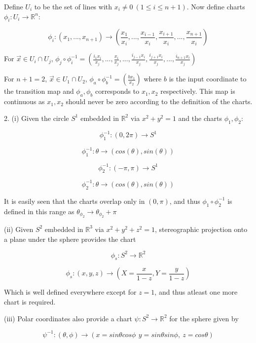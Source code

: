 \documentclass{article}\usepackage[]{graphicx}\usepackage[]{color}
\begin{document}
Define $U_i$ to be the set of lines with $x_i\neq 0 \ (1\leq i\leq n+1)$. Now define charts $\phi_i:U_i\rightarrow \mathbb{R}^n$:

$$
\phi_i: (x_1,...,x_{n+1})\rightarrow \left(\frac{x_1}{x_i},...,\frac{x_{i-1}}{x_i},\frac{x_{i+1}}{x_i},...,\frac{x_{n+1}}{x_i}\right)
$$ 

For $\vec{x}\in U_i\cap U_j$, $\phi_j\circ\phi_i^{-1}=
\left(\frac{i_1 x_i}{x_j},...,\frac{x_i}{x_j} ,...,\frac{i_{j-1}x_i}{x_j},\frac{i_{j+1}x_i}{x_j},...,\frac{i_{n+1}x_i}{x_j}\right)
$

For $n+1=2$, $\vec{x}\in U_1\cap U_2$, $\phi_a\circ\phi_b^{-1}=
\left(\frac{bx_1}{x_2}\right) 
$ where $b$ is the input coordinate to the transition map and $\phi_a,\phi_b$ corresponds to $x_1,x_2$ respectively. This map is continuous as $x_1,x_2$ should never be zero according to the definition of the charts.

2. (i) Given the circle $S^1$ embedded in $\mathbb{R}^2$ via $x^2+y^2=1$ and the charts $\phi_1 ,\phi_2$:

$$
\phi_1^{-1}: (0,2\pi )\rightarrow S^1
$$

\vspace{-.3cm}

$$
\phi_1^{-1}: \theta \rightarrow (cos(\theta ),sin(\theta ))
$$

\medskip

$$
\phi_2^{-1}: (-\pi ,\pi )\rightarrow S^1
$$

\vspace{-.3cm}

$$
\phi_2^{-1}: \theta \rightarrow (cos(\theta ),sin(\theta ))
$$

It is easily seen that the charts overlap only in $(0,\pi )$, and thus $\phi_1\circ\phi_2^{-1}$ is defined in this range as $\theta_{\phi_2}\rightarrow\theta_{\phi_2}+\pi$

(ii) Given $S^2$ embedded in $\mathbb{R}^3$ via $x^2+y^2+z^2=1$, stereographic projection onto a plane under the sphere provides the chart

 $$\phi_s:S^2\rightarrow \mathbb{R}^2$$

 $$\phi_s:(x,y,z)\rightarrow (X=\frac{x}{1-z},Y=\frac{y}{1-z})
 $$
 
Which is well defined everywhere except for $z=1$, and thus atleast one more chart is required.

(iii) Polar coordinates also provide a chart $\psi:S^2\rightarrow \mathbb{R}^2$ for the sphere given by 

$$
\psi^{-1}: (\theta ,\phi)\rightarrow(x=sin\theta cos\phi\,\ y=sin\theta sin\phi, \ z=cos\theta)
$$
\end{document}
